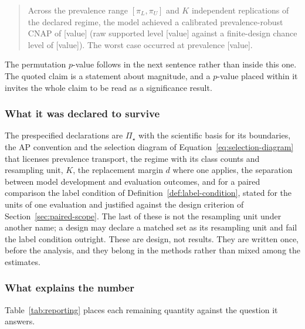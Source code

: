 \documentclass[11pt]{article}
\newcommand{\PSet}{\Pi_\star}
\theoremstyle{remark}
\begin{document}
\begin{quote}
Across the prevalence range $[\pi_L,\pi_U]$ and $K$ independent replications of the declared regime, the model achieved a calibrated prevalence-robust CNAP of [value] (raw supported level [value] against a finite-design chance level of [value]). The worst case occurred at prevalence [value].
\end{quote}

The permutation $p$-value follows in the next sentence rather than inside this one. The quoted claim is a statement about magnitude, and a $p$-value placed within it invites the whole claim to be read as a significance result.

\subsubsection*{What it was declared to survive}

The prespecified declarations are $\PSet$ with the scientific basis for its boundaries, the AP convention and the selection diagram of Equation~\eqref{eq:selection-diagram} that licenses prevalence transport, the regime with its class counts and resampling unit, $K$, the replacement margin $d$ where one applies, the separation between model development and evaluation outcomes, and for a paired comparison the label condition of Definition~\ref{def:label-condition}, stated for the units of one evaluation and justified against the design criterion of Section~\ref{sec:paired-scope}. The last of these is not the resampling unit under another name; a design may declare a matched set as its resampling unit and fail the label condition outright. These are design, not results. They are written once, before the analysis, and they belong in the methods rather than mixed among the estimates.

\subsubsection*{What explains the number}

Table~\ref{tab:reporting} places each remaining quantity against the question it answers.
\end{document}
